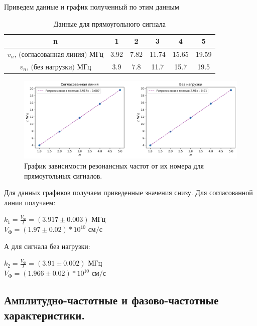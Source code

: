 \documentclass[a4paper,12pt]{article} %
\begin{document}
Приведем данные и график полученный по этим данным

\begin{table}[H]
    \centering
    \begin{tabular}{|c|c|c|c|c|c|} \hline
         n & 1 & 2 & 3 & 4 & 5\\ \hline
         $v_n \text{, (согласованная линия) МГц}$& 3.92 & 7.82 & 11.74 & 15.65 & 19.59\\ \hline
         $v_n \text{, (без нагрузки) МГц}$& 3.9 & 7.8 & 11.7 & 15.7 & 19.5\\ \hline
    \end{tabular}
    \caption{Данные для прямоугольного сигнала}
\end{table}

\begin{figure}[H]
    \centering
    \includegraphics[width=1\linewidth]{plot/fig2.png}
    \caption{График зависимости резонансных частот от их номера для прямоугольных сигналов.}
\end{figure}

Для данных графиков получаем приведенные значения снизу. Для согласованной линии получаем:
\begin{center}
    $k_1 = \frac{V_\text{Ф}}{l} = (3.917 \pm 0.003) \text{ МГц}$ \\
    $V_\text{Ф} = (1.97 \pm 0.02) * 10^{10} \text{ см/с}$
\end{center}

А для сигнала без нагрузки:
\begin{center}
    $k_2 = \frac{V_\text{Ф}}{l} = (3.91 \pm 0.002) \text{ МГц}$ \\
    $V_\text{Ф} = (1.966 \pm 0.02) * 10^{10} \text{ см/с}$
\end{center}

\subsection{Амплитудно-частотные и фазово-частотные характеристики.}
\end{document}
